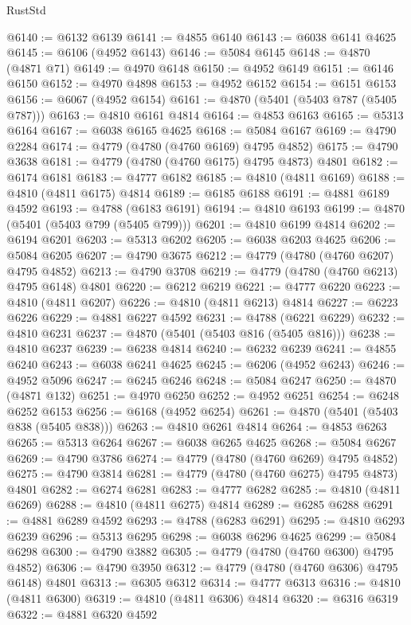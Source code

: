 \begin{lexlean}{RustStd}
\begin{coremodule}
@6140 := @6132 @6139
@6141 := @4855 @6140
@6143 := @6038 @6141 @4625
@6145 := @6106 (@4952 @6143)
@6146 := @5084 @6145
@6148 := @4870 (@4871 @71)
@6149 := @4970 @6148
@6150 := @4952 @6149
@6151 := @6146 @6150
@6152 := @4970 @4898
@6153 := @4952 @6152
@6154 := @6151 @6153
@6156 := @6067 (@4952 @6154)
@6161 := @4870 (@5401 (@5403 @787 (@5405 @787)))
@6163 := @4810 @6161 @4814
@6164 := @4853 @6163
@6165 := @5313 @6164
@6167 := @6038 @6165 @4625
@6168 := @5084 @6167
@6169 := @4790 @2284
@6174 := @4779 (@4780 (@4760 @6169) @4795 @4852)
@6175 := @4790 @3638
@6181 := @4779 (@4780 (@4760 @6175) @4795 @4873) @4801
@6182 := @6174 @6181
@6183 := @4777 @6182
@6185 := @4810 (@4811 @6169)
@6188 := @4810 (@4811 @6175) @4814
@6189 := @6185 @6188
@6191 := @4881 @6189 @4592
@6193 := @4788 (@6183 @6191)
@6194 := @4810 @6193
@6199 := @4870 (@5401 (@5403 @799 (@5405 @799)))
@6201 := @4810 @6199 @4814
@6202 := @6194 @6201
@6203 := @5313 @6202
@6205 := @6038 @6203 @4625
@6206 := @5084 @6205
@6207 := @4790 @3675
@6212 := @4779 (@4780 (@4760 @6207) @4795 @4852)
@6213 := @4790 @3708
@6219 := @4779 (@4780 (@4760 @6213) @4795 @6148) @4801
@6220 := @6212 @6219
@6221 := @4777 @6220
@6223 := @4810 (@4811 @6207)
@6226 := @4810 (@4811 @6213) @4814
@6227 := @6223 @6226
@6229 := @4881 @6227 @4592
@6231 := @4788 (@6221 @6229)
@6232 := @4810 @6231
@6237 := @4870 (@5401 (@5403 @816 (@5405 @816)))
@6238 := @4810 @6237
@6239 := @6238 @4814
@6240 := @6232 @6239
@6241 := @4855 @6240
@6243 := @6038 @6241 @4625
@6245 := @6206 (@4952 @6243)
@6246 := @4952 @5096
@6247 := @6245 @6246
@6248 := @5084 @6247
@6250 := @4870 (@4871 @132)
@6251 := @4970 @6250
@6252 := @4952 @6251
@6254 := @6248 @6252 @6153
@6256 := @6168 (@4952 @6254)
@6261 := @4870 (@5401 (@5403 @838 (@5405 @838)))
@6263 := @4810 @6261 @4814
@6264 := @4853 @6263
@6265 := @5313 @6264
@6267 := @6038 @6265 @4625
@6268 := @5084 @6267
@6269 := @4790 @3786
@6274 := @4779 (@4780 (@4760 @6269) @4795 @4852)
@6275 := @4790 @3814
@6281 := @4779 (@4780 (@4760 @6275) @4795 @4873) @4801
@6282 := @6274 @6281
@6283 := @4777 @6282
@6285 := @4810 (@4811 @6269)
@6288 := @4810 (@4811 @6275) @4814
@6289 := @6285 @6288
@6291 := @4881 @6289 @4592
@6293 := @4788 (@6283 @6291)
@6295 := @4810 @6293 @6239
@6296 := @5313 @6295
@6298 := @6038 @6296 @4625
@6299 := @5084 @6298
@6300 := @4790 @3882
@6305 := @4779 (@4780 (@4760 @6300) @4795 @4852)
@6306 := @4790 @3950
@6312 := @4779 (@4780 (@4760 @6306) @4795 @6148) @4801
@6313 := @6305 @6312
@6314 := @4777 @6313
@6316 := @4810 (@4811 @6300)
@6319 := @4810 (@4811 @6306) @4814
@6320 := @6316 @6319
@6322 := @4881 @6320 @4592

\end{coremodule}
\end{lexlean}
